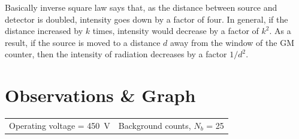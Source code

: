 Basically inverse square law says that, as the distance between source and detector is doubled, intensity goes down by a factor of four. In general, if the distance increased by $ k $ times, intensity would decrease by a factor of $ k^2 $. As a result, if the source is moved to a distance $ d $ away from the window of the GM counter, then the intensity of radiation decreases by a factor $ 1/d^2 $.


\section{Observations \& Graph}
\noindent
\begin{tabular}{p{} p{}}
	Operating voltage =  \SI{450}{\volt}&
	Background counts, $ N_b $ = 25
\end{tabular}
\vspace{-10pt}
